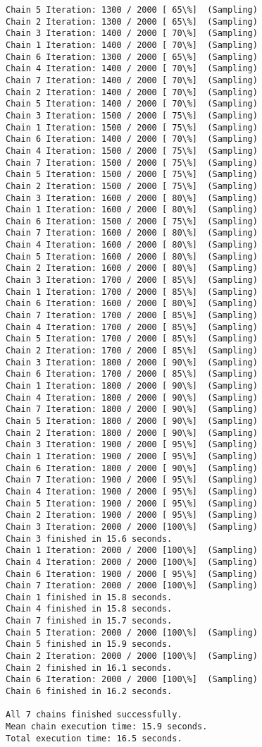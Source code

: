 \documentclass[11pt]{article}
\begin{document}
\begin{Verbatim}[commandchars=\\\{\}]
Chain 5 Iteration: 1300 / 2000 [ 65\%]  (Sampling)
Chain 2 Iteration: 1300 / 2000 [ 65\%]  (Sampling)
Chain 3 Iteration: 1400 / 2000 [ 70\%]  (Sampling)
Chain 1 Iteration: 1400 / 2000 [ 70\%]  (Sampling)
Chain 6 Iteration: 1300 / 2000 [ 65\%]  (Sampling)
Chain 4 Iteration: 1400 / 2000 [ 70\%]  (Sampling)
Chain 7 Iteration: 1400 / 2000 [ 70\%]  (Sampling)
Chain 2 Iteration: 1400 / 2000 [ 70\%]  (Sampling)
Chain 5 Iteration: 1400 / 2000 [ 70\%]  (Sampling)
Chain 3 Iteration: 1500 / 2000 [ 75\%]  (Sampling)
Chain 1 Iteration: 1500 / 2000 [ 75\%]  (Sampling)
Chain 6 Iteration: 1400 / 2000 [ 70\%]  (Sampling)
Chain 4 Iteration: 1500 / 2000 [ 75\%]  (Sampling)
Chain 7 Iteration: 1500 / 2000 [ 75\%]  (Sampling)
Chain 5 Iteration: 1500 / 2000 [ 75\%]  (Sampling)
Chain 2 Iteration: 1500 / 2000 [ 75\%]  (Sampling)
Chain 3 Iteration: 1600 / 2000 [ 80\%]  (Sampling)
Chain 1 Iteration: 1600 / 2000 [ 80\%]  (Sampling)
Chain 6 Iteration: 1500 / 2000 [ 75\%]  (Sampling)
Chain 7 Iteration: 1600 / 2000 [ 80\%]  (Sampling)
Chain 4 Iteration: 1600 / 2000 [ 80\%]  (Sampling)
Chain 5 Iteration: 1600 / 2000 [ 80\%]  (Sampling)
Chain 2 Iteration: 1600 / 2000 [ 80\%]  (Sampling)
Chain 3 Iteration: 1700 / 2000 [ 85\%]  (Sampling)
Chain 1 Iteration: 1700 / 2000 [ 85\%]  (Sampling)
Chain 6 Iteration: 1600 / 2000 [ 80\%]  (Sampling)
Chain 7 Iteration: 1700 / 2000 [ 85\%]  (Sampling)
Chain 4 Iteration: 1700 / 2000 [ 85\%]  (Sampling)
Chain 5 Iteration: 1700 / 2000 [ 85\%]  (Sampling)
Chain 2 Iteration: 1700 / 2000 [ 85\%]  (Sampling)
Chain 3 Iteration: 1800 / 2000 [ 90\%]  (Sampling)
Chain 6 Iteration: 1700 / 2000 [ 85\%]  (Sampling)
Chain 1 Iteration: 1800 / 2000 [ 90\%]  (Sampling)
Chain 4 Iteration: 1800 / 2000 [ 90\%]  (Sampling)
Chain 7 Iteration: 1800 / 2000 [ 90\%]  (Sampling)
Chain 5 Iteration: 1800 / 2000 [ 90\%]  (Sampling)
Chain 2 Iteration: 1800 / 2000 [ 90\%]  (Sampling)
Chain 3 Iteration: 1900 / 2000 [ 95\%]  (Sampling)
Chain 1 Iteration: 1900 / 2000 [ 95\%]  (Sampling)
Chain 6 Iteration: 1800 / 2000 [ 90\%]  (Sampling)
Chain 7 Iteration: 1900 / 2000 [ 95\%]  (Sampling)
Chain 4 Iteration: 1900 / 2000 [ 95\%]  (Sampling)
Chain 5 Iteration: 1900 / 2000 [ 95\%]  (Sampling)
Chain 2 Iteration: 1900 / 2000 [ 95\%]  (Sampling)
Chain 3 Iteration: 2000 / 2000 [100\%]  (Sampling)
Chain 3 finished in 15.6 seconds.
Chain 1 Iteration: 2000 / 2000 [100\%]  (Sampling)
Chain 4 Iteration: 2000 / 2000 [100\%]  (Sampling)
Chain 6 Iteration: 1900 / 2000 [ 95\%]  (Sampling)
Chain 7 Iteration: 2000 / 2000 [100\%]  (Sampling)
Chain 1 finished in 15.8 seconds.
Chain 4 finished in 15.8 seconds.
Chain 7 finished in 15.7 seconds.
Chain 5 Iteration: 2000 / 2000 [100\%]  (Sampling)
Chain 5 finished in 15.9 seconds.
Chain 2 Iteration: 2000 / 2000 [100\%]  (Sampling)
Chain 2 finished in 16.1 seconds.
Chain 6 Iteration: 2000 / 2000 [100\%]  (Sampling)
Chain 6 finished in 16.2 seconds.

All 7 chains finished successfully.
Mean chain execution time: 15.9 seconds.
Total execution time: 16.5 seconds.

    \end{Verbatim}
\end{document}

